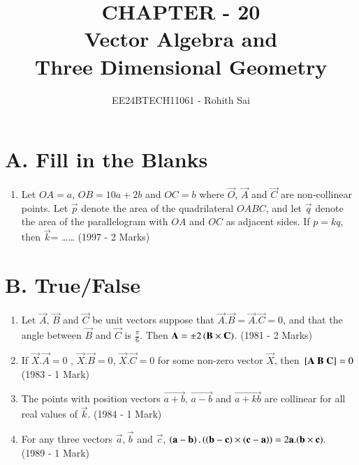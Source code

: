 \documentclass[journal]{IEEEtran}
\begin{document}

\vspace{3cm}

\title{CHAPTER - 20\\Vector Algebra and\\Three Dimensional Geometry}
\author{EE24BTECH11061 - Rohith Sai}
\maketitle

\renewcommand{\thefigure}{\theenumi}
\renewcommand{\thetable}{\theenumi}

\section{A. Fill in the Blanks}
\begin{enumerate}
\item Let $OA=a$, $OB = 10a + 2b$ and $OC =b$ where $\vec{O}$, $\vec{A}$ and $\vec{C}$ are non-collinear points. Let $\vec{p}$ denote the area of the quadrilateral $OABC$, and let $\vec{q}$ denote the area of the parallelogram with $OA$ and $OC$ as adjacent sides. If $p=kq$, then $\vec{k}$= \dots\dots
\hfill (1997 - 2 Marks)
\end{enumerate}

\section{B. True/False}
\begin{enumerate}
\item Let $\vec{A}$, $\vec{B}$ and $\vec{C}$ be unit vectors suppose that $\vec{A}.\vec{B} = \vec{A}.\vec{C}=0$, and that the angle between $\vec{B}$ and $\vec{C}$ is $\frac{\pi}{6}$. Then $\mathbf{A}=\pm2\left(\mathbf{B}\times\mathbf{C}\right)$.
\hfill (1981 - 2 Marks)

\item If $\vec{X}.\vec{A}=0$ , $\vec{X}.\vec{B}=0$, $\vec{X}.\vec{C}=0$ for some non-zero vector $\vec{X}$, then $\sbrak{\vec{A}\ \vec{B}\ \vec{C}}=0$\\
\hfill (1983 - 1 Mark)

\item The points with position vectors $\vec{a+b}$, $\vec{a-b}$ and $\vec{a+kb}$ are collinear for all real values of $\vec{k}$.
\hfill (1984 - 1 Mark)

\item For any three vectors $\vec{a}, \vec{b}$ and $\vec{c}$, $\left(\mathbf{a}-\mathbf{b}\right).\left({\left(\mathbf{b}-\mathbf{c)}\times(\mathbf{c}-\mathbf{a}\right)}\right) = 2\mathbf{a}.(\mathbf{b}\times\mathbf{c}).$\\
\hfill (1989 - 1 Mark)
\end{enumerate}
\end{document}
